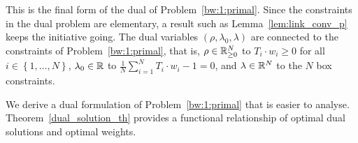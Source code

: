 \begin{remark}
  This is the final form of the dual of Problem~\ref{bw:1:primal}.
  Since the constraints in the dual problem are elementary,
  a result such as Lemma~\ref{lem:link_conv_p}
  keeps the initiative going.
  The dual variables $(\rho,\lambda_0,\lambda)$ are connected to the constraints of Problem~\ref{bw:1:primal}, that is,
  $\rho\in\mathbb{R}^N_{\ge 0}$
  to
  $T_i\cdot w_i\ge 0$ for all $i\in \left\{ 1,\ldots,N \right\}$,
  $\lambda_0\in\mathbb{R}$ 
  to 
  $
  \frac{1}{N}
  \sum_{i=1}^{N} 
  T_i\cdot w_i
  -
  1
  =
  0
  $,
  and
  $\lambda\in\mathbb{R}^N$ to the $N$ box constraints.
\end{remark}
\begin{takeaways}
  We derive a dual formulation of Problem~\ref{bw:1:primal} that is easier to analyse.
  Theorem~\ref{dual_solution_th} provides a functional relationship of optimal dual solutions and 
  optimal weights.
\end{takeaways}
